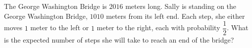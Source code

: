 The George Washington Bridge is $2016$ meters long. Sally is standing on the George Washington Bridge, $1010$ meters from its left end. Each step, she either moves $1$ meter to the left or $1$ meter to the right, each with probability $\dfrac{1}{2}$. What is the expected number of steps she will take to reach an end of the bridge?